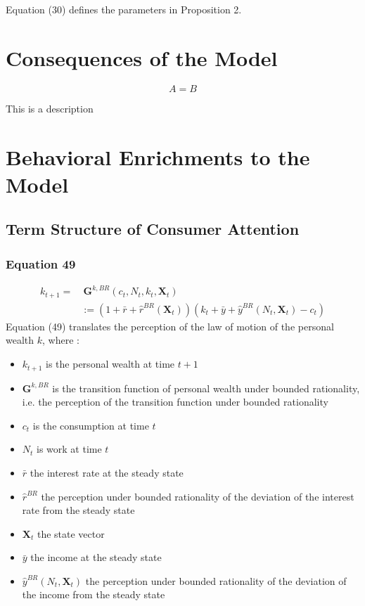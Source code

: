 \documentclass{article}
\begin{document}
Equation (30) defines the parameters in Proposition 2.

\section{Consequences of the Model}

\begin{equation}
    A = B
\end{equation}

This is a description


\section{Behavioral Enrichments to the Model}

\subsection{Term Structure of Consumer Attention}

\subsubsection*{Equation 49}

\begin{equation} \tag{49}
    \begin{split}
        k_{t+1}= &\  \textbf{G}^{k,BR}(c_{t},N_{t},k_{t},\textbf{X}_{t}) \\
        & := (1+\bar{r}+\hat{r}^{BR}(\textbf{X}_t))(k_{t}+\bar{y}+\hat{y}^{BR}(N_{t},\textbf{X}_t)-c_{t})
    \end{split}
\end{equation}
Equation (49) translates the perception of the law of motion of the personal wealth $k$, where : 
\begin{itemize}
    \item $k_{t+1}$ is the personal wealth at time $t+1$
    \item $\textbf{G}^{k,BR}$ is the transition function of personal wealth under bounded rationality, i.e. the perception of the transition function under bounded rationality
    \item $c_t$ is the consumption at time $t$
    \item $N_{t}$ is work at time $t$
    \item $\bar{r}$ the interest rate at the steady state
    \item $\hat{r}^{BR}$ the perception under bounded rationality of the deviation of the interest rate from the steady state 
    \item $\textbf{X}_t$ the state vector
    \item $\bar{y}$ the income at the steady state 
    \item $\hat{y}^{BR}(N_t,\textbf{X}_{t})$ the perception under bounded rationality of the deviation of the income from the steady state
\end{itemize}
\end{document}
